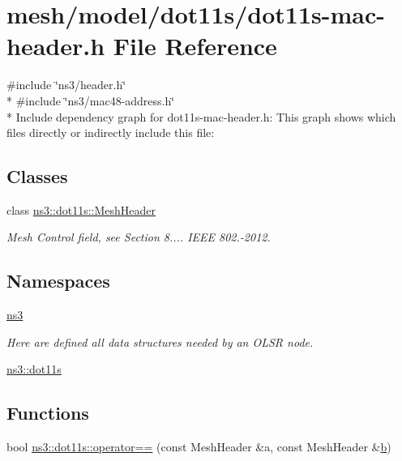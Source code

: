 \hypertarget{dot11s-mac-header_8h}{}\section{mesh/model/dot11s/dot11s-\/mac-\/header.h File Reference}
\label{dot11s-mac-header_8h}
{\ttfamily \#include \char`\"{}ns3/header.\+h\char`\"{}}\\*
{\ttfamily \#include \char`\"{}ns3/mac48-\/address.\+h\char`\"{}}\\*
Include dependency graph for dot11s-\/mac-\/header.h\+:
This graph shows which files directly or indirectly include this file\+:
\subsection*{Classes}
\begin{DoxyCompactItemize}
\item 
class \hyperlink{classns3_1_1dot11s_1_1MeshHeader}{ns3\+::dot11s\+::\+Mesh\+Header}
\begin{DoxyCompactList}\small\item\em Mesh Control field, see Section 8.... I\+E\+EE 802.-\/2012. \end{DoxyCompactList}\end{DoxyCompactItemize}
\subsection*{Namespaces}
\begin{DoxyCompactItemize}
\item 
 \hyperlink{namespacens3}{ns3}
\begin{DoxyCompactList}\small\item\em Here are defined all data structures needed by an O\+L\+SR node. \end{DoxyCompactList}\item 
 \hyperlink{namespacens3_1_1dot11s}{ns3\+::dot11s}
\end{DoxyCompactItemize}
\subsection*{Functions}
\begin{DoxyCompactItemize}
\item 
bool \hyperlink{namespacens3_1_1dot11s_acadd63337d60944cc456d433eb374cbc}{ns3\+::dot11s\+::operator==} (const Mesh\+Header \&a, const Mesh\+Header \&\hyperlink{lte__pathloss_8m_a21ad0bd836b90d08f4cf640b4c298e7c}{b})
\end{DoxyCompactItemize}

